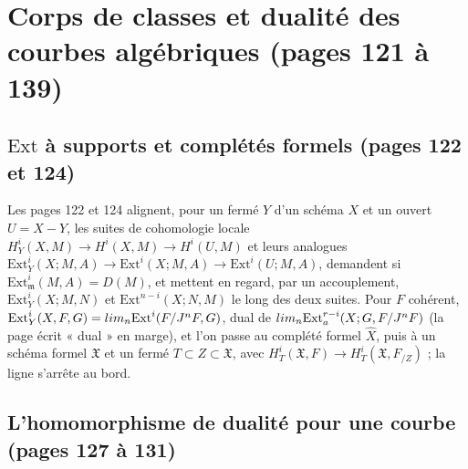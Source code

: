 \documentclass[11pt,a4paper]{article}
\begin{document}
\section*{Corps de classes et dualité des courbes algébriques (pages 121 à 139)}

\subsection*{$\mathrm{Ext}$ à supports et complétés formels (pages 122 et 124)}

Les pages 122 et 124 alignent, pour un fermé $Y$ d'un schéma $X$ et un ouvert $U
= X - Y$, les suites de cohomologie locale $H^i_Y(X, M) \to H^i(X, M) \to H^i(U, M)$
et leurs analogues $\mathrm{Ext}^i_Y(X; M, A) \to \mathrm{Ext}^i(X; M, A) \to
\mathrm{Ext}^i(U; M, A)$, demandent si $\mathrm{Ext}^i_{\mathfrak{m}}(M, A) = D(M)$,
et mettent en regard, par un accouplement, $\mathrm{Ext}^i_Y(X; M, N)$ et
$\mathrm{Ext}^{n-i}(X; N, M)$ le long des deux suites. Pour $F$ cohérent,
$\mathrm{Ext}^i_Y(X, F, G) = \varinjlim_n \mathrm{Ext}^i(F/J^nF, G)$, dual de
$\varprojlim_n \mathrm{Ext}^{r-i}_a(X; G, F/J^nF)$ (la page écrit « dual » en marge),
et l'on passe au complété formel $\hat X$, puis à un schéma formel $\mathfrak{X}$
et un fermé $T \subset Z \subset \mathfrak{X}$, avec $H^i_T(\mathfrak{X}, F) \to
H^i_T(\mathfrak{X}, F_{/Z})$ ; la ligne s'arrête au bord.

\subsection*{L'homomorphisme de dualité pour une courbe (pages 127 à 131)}
\end{document}
